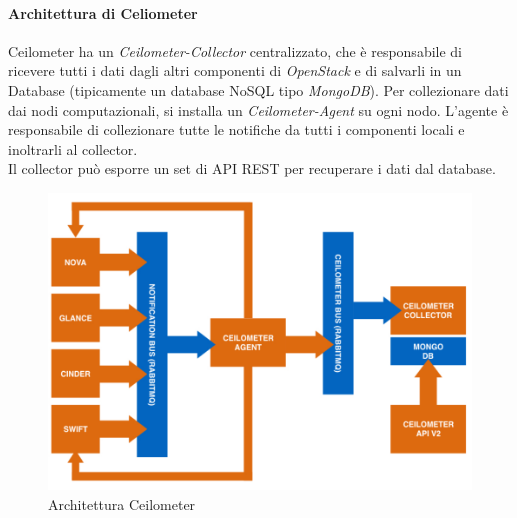 \documentclass{article}
\begin{document}
\paragraph{Architettura di Celiometer}
Ceilometer ha un \textit{Ceilometer-Collector} centralizzato, che è responsabile di ricevere tutti i dati dagli altri componenti di \textit{OpenStack} e di salvarli in un Database (tipicamente un database NoSQL tipo \textit{MongoDB}). Per collezionare dati dai nodi computazionali, si installa un \textit{Ceilometer-Agent} su ogni nodo. L'agente è responsabile di collezionare tutte le notifiche da tutti i componenti locali e inoltrarli al collector. \\
Il collector può esporre un set di API REST per recuperare i dati dal database.
\begin{figure}[H]
    \centering
    \includegraphics[scale=0.5]{img/Ceilometer architecture.png}
    \caption{Architettura Ceilometer}
\end{figure}\noindent
\end{document}
